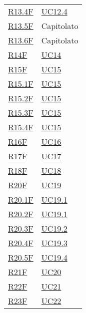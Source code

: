 \begin{center}
\begin{longtable}[!h]{p{50px} p{50px}}
        \hyperref[tab:RequisitiFunzionali]{R13.4F}   & \hyperref[sec:UC12.4]{UC12.4} \\
        \hyperref[tab:RequisitiFunzionali]{R13.5F}   & Capitolato                    \\
        \hyperref[tab:RequisitiFunzionali]{R13.6F}   & Capitolato                    \\
        \hyperref[tab:RequisitiFunzionali]{R14F}     & \hyperref[sec:UC14]{UC14}     \\
        \hyperref[tab:RequisitiFunzionali]{R15F}     & \hyperref[sec:UC15]{UC15}     \\
        \hyperref[tab:RequisitiFunzionali]{R15.1F}   & \hyperref[sec:UC15]{UC15}     \\
        \hyperref[tab:RequisitiFunzionali]{R15.2F}   & \hyperref[sec:UC15]{UC15}     \\
        \hyperref[tab:RequisitiFunzionali]{R15.3F}   & \hyperref[sec:UC15]{UC15}     \\
        \hyperref[tab:RequisitiFunzionali]{R15.4F}   & \hyperref[sec:UC15]{UC15}     \\
        \hyperref[tab:RequisitiFunzionali]{R16F}     & \hyperref[sec:UC16]{UC16}     \\
        \hyperref[tab:RequisitiFunzionali]{R17F}     & \hyperref[sec:UC17]{UC17}     \\
        \hyperref[tab:RequisitiFunzionali]{R18F}     & \hyperref[sec:UC18]{UC18}     \\
        \hyperref[tab:RequisitiFunzionali]{R20F}     & \hyperref[sec:UC19]{UC19}     \\
        \hyperref[tab:RequisitiFunzionali]{R20.1F}   & \hyperref[sec:UC19.1]{UC19.1} \\
        \hyperref[tab:RequisitiFunzionali]{R20.2F}   & \hyperref[sec:UC19.1]{UC19.1} \\
        \hyperref[tab:RequisitiFunzionali]{R20.3F}   & \hyperref[sec:UC19.2]{UC19.2} \\
        \hyperref[tab:RequisitiFunzionali]{R20.4F}   & \hyperref[sec:UC19.3]{UC19.3} \\
        \hyperref[tab:RequisitiFunzionali]{R20.5F}   & \hyperref[sec:UC19.4]{UC19.4} \\
        \hyperref[tab:RequisitiFunzionali]{R21F}     & \hyperref[sec:UC20]{UC20}     \\
        \hyperref[tab:RequisitiFunzionali]{R22F}     & \hyperref[sec:UC21]{UC21}     \\
        \hyperref[tab:RequisitiFunzionali]{R23F}     & \hyperref[sec:UC22]{UC22}     \\

\end{longtable}
\end{center}
